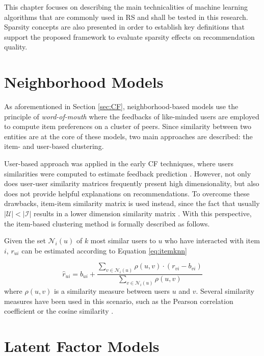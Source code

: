 This chapter focuses on describing the main technicalities of machine learning algorithms that are commonly used in RS and shall be tested in this research. Sparsity concepts are also presented in order to establish key definitions that support the proposed framework to evaluate sparsity effects on recommendation quality.

\section{Neighborhood Models}

As aforementioned in Section \ref{sec:CF}, neighborhood-based models use the principle of \textit{word-of-mouth} where the feedbacks of like-minded users are employed to compute item preferences on a cluster of peers. Since similarity between two entities are at the core of these models, two main approaches are described: the item- and user-based clustering.

User-based approach was applied in the early CF techniques, where users similarities were computed to estimate feedback prediction \cite{1999AlgorithmicFramework}. However, not only does user-user similarity matrices frequently present high dimensionality, but also does not provide helpful explanations on recommendations. To overcome these drawbacks, item-item similarity matrix is used instead, since the fact that usually $|\mathcal{U}| < |\mathcal{I}|$ results in a lower dimension similarity matrix \cite{2001sarwar}. With this perspective, the item-based clustering method is formally described as follows.

Given the set $\mathcal{N}_i(u)$ of $k$ most similar users to $u$ who have interacted with item $i$, $r_{ui}$ can be estimated according to Equation \ref{eq:itemknn}

\begin{equation} 
    \label{eq:itemknn}
    \hat{r}_{ui} = b_{ui} + \frac{\sum_{v \in \mathcal{N}_i(u)} \rho(u,v)\cdot (r_{vi}-b_{vi})}{\sum_{v \in \mathcal{N}_i(u)} \rho(u,v)}
\end{equation} where $\rho(u,v)$ is a similarity measure between users $u$ and $v$. Several similarity measures have been used in this scenario, such as the Pearson correlation coefficient or the cosine similarity \cite{2010Handbook}.

\section{Latent Factor Models}


